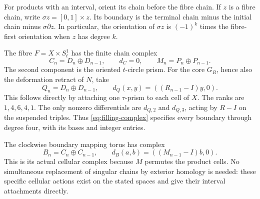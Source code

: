 \documentclass[11pt]{article}
\numberwithin{equation}{section}
\begin{document}
For products with an interval, orient its chain before the fibre chain.
If $z$ is a fibre chain, write $\sigma z=[0,1]\times z$.
Its boundary is the terminal chain minus the initial chain minus
$\sigma\partial z$. In particular, the orientation of $\sigma z$
is $(-1)^k$ times the fibre-first orientation when $z$ has degree $k$.

The fibre $F=X\times S^1_t$ has the finite chain complex
\begin{equation}\label{eq:fibre-complex}
 C_n=D_n\oplus D_{n-1},\qquad d_C=0,
 \qquad M_n=P_n\oplus P_{n-1}.
\end{equation}
The second component is the oriented $t$-circle prism.
For the core $G_R$, hence also the deformation retract of $N$, take
\begin{equation}\label{eq:filling-complex}
 Q_n=D_n\oplus D_{n-1},\qquad
 d_Q(x,y)=((R_{n-1}-I)y,0).
\end{equation}
This follows directly by attaching one $\tau$-prism to each cell of $X$.
The ranks are $1,4,6,4,1$. The only nonzero differentials are
$d_{Q,2}$ and $d_{Q,3}$, acting by $R-I$ on the suspended triples.
Thus \eqref{eq:filling-complex} specifies every boundary through degree
four, with its bases and integer entries.

The clockwise boundary mapping torus has complex
\begin{equation}\label{eq:boundary-complex}
 B_n=C_n\oplus C_{n-1},\qquad
 d_B(a,b)=((M_{n-1}-I)b,0).
\end{equation}
This is its actual cellular complex because $M$ permutes the product
cells. No simultaneous replacement of singular chains by exterior
homology is needed: these specific cellular actions exist on the stated
spaces and give their interval attachments directly.
\end{document}
